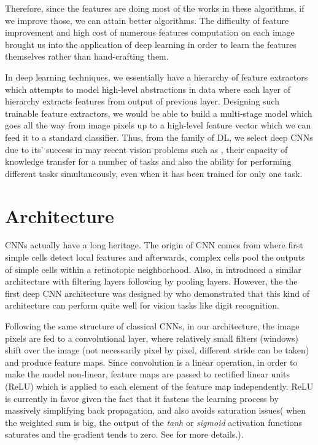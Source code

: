\indent Therefore, since the features are doing most of the works in these algorithms, if we improve those, we can attain better algorithms. The difficulty of feature improvement and high cost of numerous features computation on each image brought us into the application of deep learning in order to learn the features themselves rather than hand-crafting them. 

In deep learning techniques, we essentially have a hierarchy of feature extractors which attempts to model high-level abstractions in data\cite{deng2014deep, bengio2009learning, bengio2013representation, arel2010deep, schmidhuber2015deep} where each layer of hierarchy extracts features from output of previous layer. Designing such trainable feature extractors, we would be able to build a multi-stage model which goes all the way from image pixels up to a high-level feature vector which we can feed it to a standard classifier. Thus, from the family of DL, we select deep CNNs due to its' success in may recent vision problems such as \cite{cirecsan2011convolutional, ciresan2015multi, wan2013regularization, cirecsan2012multi}, their capacity of knowledge transfer for a number of tasks and also the ability for performing different tasks simultaneously, even when it has been trained for only one task\cite{zhou2014learning}. 

\section{Architecture}

CNNs actually have a long heritage. The origin of CNN comes from \cite{hubel1962receptive} where first simple cells detect local features and afterwards, complex cells pool the outputs of simple cells within a retinotopic neighborhood. Also, \citeauthor*{fukushima1975cognitron} in \cite{fukushima1975cognitron, fukushima1980neocognitron} introduced a similar architecture with filtering layers following by pooling layers. However, the the first deep CNN architecture was designed by \citealt{lecun1989backpropagation} who demonstrated that this kind of architecture can perform quite well for vision tasks like digit recognition.

Following the same structure of classical CNNs, in our architecture, the image pixels are fed to a convolutional layer, where relatively small filters (windows) shift over the image (not necessarily pixel by pixel, different stride can be taken) and produce feature maps. Since convolution is a linear operation, in order to make the model non-linear, feature maps are passed to rectified linear units (ReLU) \cite{nair2010rectified} which is applied to each element of the feature map independently. ReLU is currently in favor given the fact that it fastens the learning process by massively simplifying back propagation, and also avoids saturation issues( when the weighted sum is big, the output of the \textit{tanh} or \textit{sigmoid} activation functions saturates and the gradient tends to zero. See \cite{hansen1990neural, amit1987statistical} for more details.). 

